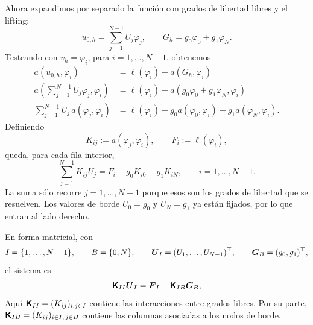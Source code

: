\documentclass[11pt]{article}
\def\mat   #1{\mbox{\boldmath $\mathsf #1$}}
\def\vec   #1{\mbox{\boldmath $#1$}{}}
\begin{document}
\begin{enumerate}[label=\textbf{\arabic*.}, leftmargin=*]
\begin{enumerate}[label=(\alph*)]
        Ahora expandimos por separado la función con grados de libertad libres y el lifting:
        \[
            u_{0,h}=\sum_{j=1}^{N-1}U_j\varphi_j,
            \qquad
            G_h=g_0\varphi_0+g_1\varphi_N.
        \]
        Testeando con $v_h=\varphi_i$, para $i=1,\dots,N-1$, obtenemos
        \[
        \begin{aligned}
            a(u_{0,h},\varphi_i)
            &=
            \ell(\varphi_i)-a(G_h,\varphi_i)\\
            a\left(\sum_{j=1}^{N-1}U_j\varphi_j,\varphi_i\right)
            &=
            \ell(\varphi_i)-a(g_0\varphi_0+g_1\varphi_N,\varphi_i)\\
            \sum_{j=1}^{N-1}U_j\,a(\varphi_j,\varphi_i)
            &=
            \ell(\varphi_i)
            -g_0a(\varphi_0,\varphi_i)
            -g_1a(\varphi_N,\varphi_i).
        \end{aligned}
        \]
        Definiendo
        \[
            K_{ij}:=a(\varphi_j,\varphi_i),
            \qquad
            F_i:=\ell(\varphi_i),
        \]
        queda, para cada fila interior,
        \[
            \boxed{
            \sum_{j=1}^{N-1}K_{ij}U_j
            =
            F_i-g_0K_{i0}-g_1K_{iN},
            \qquad i=1,\dots,N-1.
            }
        \]
        La suma sólo recorre $j=1,\dots,N-1$ porque esos son los grados de libertad que se resuelven. Los valores de borde $U_0=g_0$ y $U_N=g_1$ ya están fijados, por lo que entran al lado derecho.

        En forma matricial, con
        \[
            I=\{1,\dots,N-1\},
            \qquad
            B=\{0,N\},
            \qquad
            \vec U_I=(U_1,\dots,U_{N-1})^\top,
            \qquad
            \vec G_B=(g_0,g_1)^\top,
        \]
        el sistema es
        \[
            \mat K_{II}\vec U_I
            =
            \vec F_I-\mat K_{IB}\vec G_B,
        \]
        Aquí $\mat K_{II}=(K_{ij})_{i,j\in I}$ contiene las interacciones entre grados libres. Por su parte, $\mat K_{IB}=(K_{ij})_{i\in I,\,j\in B}$ contiene las columnas asociadas a los nodos de borde.


\end{enumerate}
\end{enumerate}
\end{document}
